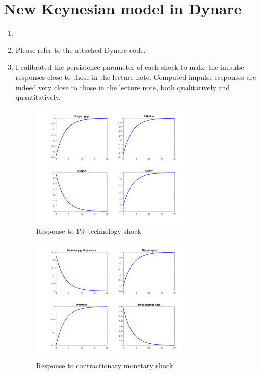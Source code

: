 \documentclass[11pt]{amsart}
\begin{document}
\section{New Keynesian model in Dynare}
\begin{enumerate}[label = (\alph*)]
	\item 
	\item Please refer to the attached Dynare code. 
	\item I calibrated the persistence parameter of each shock to make the impulse responses close to those in the lecture note. Computed impulse responses are indeed very close to those in the lecture note, both qualitatively and quantitatively.
	\begin{figure}[H]
		\centering
		\includegraphics[width=0.75\textwidth]{techshock}
		\caption{Response to 1\% technology shock}
	\end{figure}

    \begin{figure}[H]
    	\centering
    	\includegraphics[width=0.75\textwidth]{monetaryshock}
    	\caption{Response to contractionary monetary shock}
    \end{figure}  
\end{enumerate}
\end{document}

